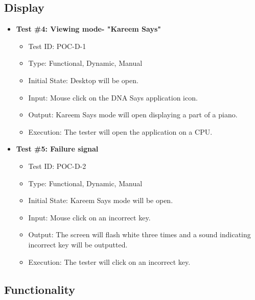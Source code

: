 \documentclass[12pt, titlepage]{article}
\begin{document}
\subsection{Display}

\begin{itemize}

\item \textbf{Test \#4: Viewing mode- "Kareem Says"}
\begin{itemize}
\item Test ID: POC-D-1
\item Type: Functional, Dynamic, Manual 		
\item Initial State: Desktop will be open. 					
\item Input: Mouse click on the DNA Says application icon.			
\item Output: Kareem Says mode will open displaying a part of a piano.		
\item Execution: The tester will open the application on a CPU. 
\end{itemize}

\item \textbf{Test \#5: Failure signal}
\begin{itemize}
\item Test ID: POC-D-2
\item Type: Functional, Dynamic, Manual		
\item Initial State: Kareem Says mode will be open.					
\item Input: Mouse click on an incorrect key.					
\item Output: The screen will flash white three times and a sound indicating incorrect key will be outputted.  					
\item Execution: The tester will click on an incorrect key.  
\end{itemize}

\end{itemize}

\subsection{Functionality}
\end{document}
